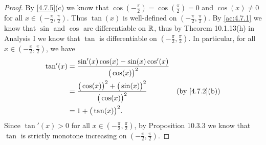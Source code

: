 \begin{proof}
  By \cref{4.7.5}(c) we know that \(\cos(-\frac{\pi}{2}) = \cos(\frac{\pi}{2}) = 0\) and \(\cos(x) \neq 0\) for all \(x \in (-\frac{\pi}{2}, \frac{\pi}{2})\).
  Thus \(\tan(x)\) is well-defined on \((-\frac{\pi}{2}, \frac{\pi}{2})\).
  By \cref{ac:4.7.1} we know that \(\sin\) and \(\cos\) are differentiable on \(\mathbb{R}\), thus by Theorem 10.1.13(h) in Analysis I we know that \(\tan\) is differentiable on \((-\frac{\pi}{2}, \frac{\pi}{2})\).
  In particular, for all \(x \in (-\frac{\pi}{2}, \frac{\pi}{2})\), we have
  \begin{align*}
    \tan'(x) & = \frac{\sin'(x) \cos(x) - \sin(x) \cos'(x)}{\big(\cos(x)\big)^2}                                     \\
             & = \frac{\big(\cos(x)\big)^2 + \big(\sin(x)\big)^2}{\big(\cos(x)\big)^2} & \text{(by \cref{4.7.2}(b))} \\
             & = 1 + \big(\tan(x)\big)^2.
  \end{align*}
  Since \(\tan'(x) > 0\) for all \(x \in (-\frac{\pi}{2}, \frac{\pi}{2})\), by Proposition 10.3.3 we know that \(\tan\) is strictly monotone increasing on \((-\frac{\pi}{2}, \frac{\pi}{2})\).


\end{proof}

